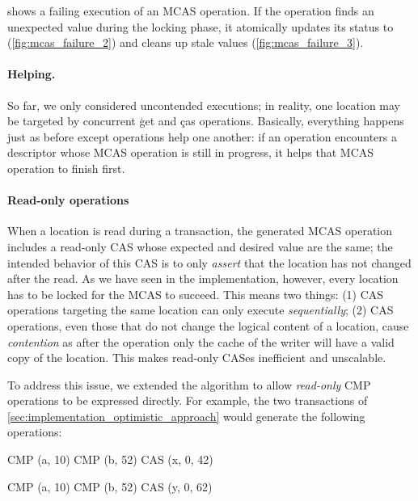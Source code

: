  shows a failing execution of an MCAS operation.
If the operation finds an unexpected value during the locking phase, it atomically updates its status to  (\cref{fig:mcas_failure_2}) and cleans up stale values (\cref{fig:mcas_failure_3}).

\paragraph{Helping.}

So far, we only considered uncontended executions; in reality, one location may be targeted by concurrent \c{get} and \c{cas} operations.
Basically, everything happens just as before except operations help one another: if an operation encounters a descriptor whose MCAS operation is still in progress, it helps that MCAS operation to finish first.

\paragraph{Read-only operations}

When a location is read during a transaction, the generated MCAS operation includes a read-only CAS whose expected and desired value are the same; the intended behavior of this CAS is to only \emph{assert} that the location has not changed after the read.
As we have seen in the implementation, however, every location has to be locked for the MCAS to succeed.
This means two things: (1) CAS operations targeting the same location can only execute \emph{sequentially}; (2) CAS operations, even those that do not change the logical content of a location, cause \emph{contention} as after the operation only the cache of the writer will have a valid copy of the location.
This makes read-only CASes inefficient and unscalable.

To address this issue, we extended the algorithm to allow \emph{read-only} CMP operations to be expressed directly.
For example, the two transactions of \cref{sec:implementation_optimistic_approach} would generate the following operations:

\smallskip
\begin{minipage}[t]{.45\textwidth}
\begin{ocamlcode}
CMP (a, 10)
CMP (b, 52)
CAS (x, 0, 42)
\end{ocamlcode}
\end{minipage}
\hfill
\begin{minipage}[t]{.45\textwidth}
\begin{ocamlcode}
CMP (a, 10)
CMP (b, 52)
CAS (y, 0, 62)
\end{ocamlcode}
\end{minipage}
\smallskip

